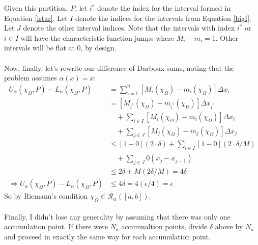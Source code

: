 \documentclass[12pt]{article}
\theoremstyle{plain}
\theoremstyle{definition}
\theoremstyle{remark}
\begin{document}
\begin{enumerate}
    Given this partition, $P$, let $i^*$ denote
    the index for the interval formed in 
    Equation \ref{istar}. Let $I$ denote the indices 
    for the intervals from Equation
    \ref{bigI}. Let $J$ denote the other interval 
    indices. Note that the intervals with index $i^*$
    or $i\in I$ will have the characteristic-function 
    jumps where $M_i - m_i = 1$. Other intervals will
    be flat at 0, by design.
    \\
    \\
    Now, finally, let's rewrite our difference
    of Darboux sums, noting that the problem assumes
    $\alpha(x)=x$:
    \begin{align*}
        U_\alpha(\chi_\Omega, P) - 
            L_\alpha(\chi_\Omega, P) &=
            \sum^n_{i=1} [M_i(\chi_\Omega) 
            - m_i(\chi_\Omega)] \Delta x_i \\
        &=  [M_{i^*}(\chi_\Omega) - m_{i^*}(\chi_\Omega)]
            \Delta x_{i^*} \\
        &\quad +
            \sum_{i\in I}[M_{i}(\chi_\Omega) - m_{i}(\chi_\Omega)]
                \Delta x_i \\
        &\quad +
            \sum_{j\in J}[M_{j}(\chi_\Omega) - m_{j}(\chi_\Omega)]
                \Delta x_j \\
        &\leq [1 - 0]
            \left(2\cdot\delta\right) 
         +
            \sum_{i\in I}[1-0]
            \left(2\cdot\delta/M\right) \\
        &\quad +
            \sum_{j\in J} 0
                (x_j - x_{j-1}) \\
        &\leq 2\delta + M (2\delta/M) = 4\delta\\
        \Rightarrow U_\alpha(\chi_\Omega, P) - 
            L_\alpha(\chi_\Omega, P) &\leq
            4\delta = 4(\epsilon/4) = \epsilon
    \end{align*}
    So by Riemann's condition $\chi_\Omega \in 
    \mathscr{R}_\alpha([a,b])$.
    \\
    \\
    Finally, I didn't lose any generality by assuming that
    there was only one accumulation point.  If there
    were $N_a$ accumualtion points, divide $\delta$ 
    above by $N_a$ and proceed in exactly the same way
    for each accumulation point.  





  
    




\end{enumerate}





% 
\end{document}
